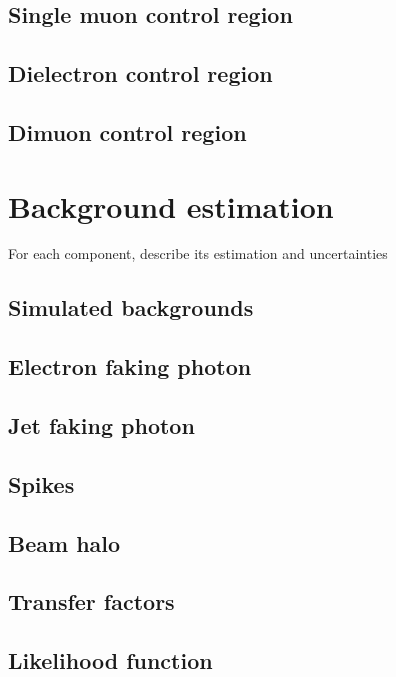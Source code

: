 \documentclass[oneside, letterpaper, 12pt, oldfontcommands]{memoir}
\begin{document}
\section{Single muon control region} \label{sec:event_selection_monomu}
\section{Dielectron control region} \label{sec:event_selection_diele}
\section{Dimuon control region} \label{sec:event_selection_dimu}

\chapter{Background estimation} \label{chap:background_estimation}
For each component, describe its estimation and uncertainties
\section{Simulated backgrounds} \label{sec:background_estimation_simulated}
\section{Electron faking photon} \label{sec:background_estimation_elefake}
\section{Jet faking photon} \label{sec:background_estimation_jetfake}
\section{Spikes} \label{sec:background_estimation_spikes}
\section{Beam halo} \label{sec:background_estimation_halo}
\section{Transfer factors} \label{sec:background_estimation_transfer_factors}
\section{Likelihood function} \label{sec:background_estimation_likelihood}
\end{document}
